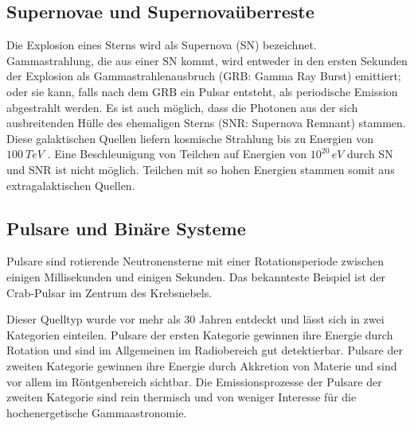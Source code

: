 

\subsection{Supernovae und Supernovaüberreste}
Die Explosion eines Sterns wird als Supernova (SN) bezeichnet.
Gammastrahlung, die aus einer SN kommt, wird entweder in den ersten Sekunden der Explosion als Gammastrahlenausbruch (GRB: Gamma Ray Burst) emittiert; oder sie kann, falls nach dem GRB ein Pulsar entsteht, als periodische Emission abgestrahlt werden.
Es ist auch möglich, dass die Photonen aus der sich ausbreitenden Hülle des ehemaligen Sterns (SNR: Supernova Remnant) stammen. 
Diese galaktischen Quellen liefern kosmische Strahlung bis zu Energien von $\SI{100}{TeV}$ \cite{Weekes}.
Eine Beschleunigung von Teilchen auf Energien von $10^{20}\,\si{eV}$ durch SN und SNR ist nicht möglich.
Teilchen mit so hohen Energien stammen somit aus extragalaktischen Quellen.\cite{Weekes}



\subsection{Pulsare und Binäre Systeme}
Pulsare sind rotierende Neutronensterne mit einer Rotationsperiode zwischen einigen Millisekunden und einigen Sekunden.
Das bekannteste Beispiel ist der Crab-Pulsar im Zentrum des Krebsnebels.

Dieser Quelltyp wurde vor mehr als 30 Jahren entdeckt und lässt sich in zwei Kategorien einteilen.
Pulsare der ersten Kategorie gewinnen ihre Energie durch Rotation und sind im Allgemeinen im Radiobereich gut detektierbar.
Pulsare der zweiten Kategorie gewinnen ihre Energie durch Akkretion von Materie und sind vor allem im Röntgenbereich sichtbar.
Die Emissionsprozesse der Pulsare der zweiten Kategorie sind rein thermisch und von weniger Interesse für die hochenergetische Gammaastronomie.

